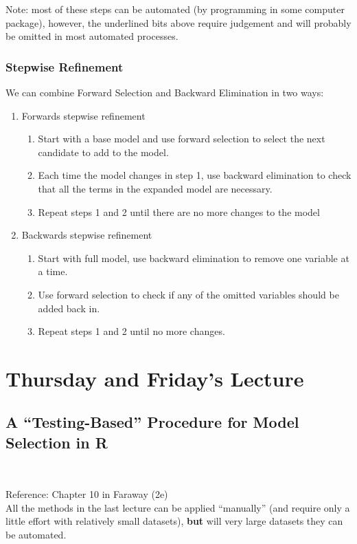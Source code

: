 \documentclass[a4paper, 11pt, twoside]{article}
\begin{document}
Note: most of these steps can be automated (by programming in some computer package), however, the underlined bits above require judgement and will probably be omitted in most automated processes.

\subsubsection{Stepwise Refinement}

We can combine Forward Selection and Backward Elimination in two ways:

\begin{enumerate}
	\item Forwards	stepwise refinement
	\begin{enumerate}
		\item Start with a base model and use forward selection to select the next candidate to add to the model.
		\item Each time the model changes in step 1, use backward elimination to check that all the terms in the expanded model are necessary.
		\item Repeat steps 1 and 2 until there are no more changes to the model
	\end{enumerate}
	\item Backwards stepwise refinement
	\begin{enumerate}
		\item Start with full model, use backward elimination to remove one variable at a time.
		\item Use forward selection to check if any of the omitted variables should be added back in.
		\item Repeat steps 1 and 2 until no more changes.	
	\end{enumerate}
\end{enumerate}

\section{Thursday and Friday's Lecture}
\subsection{A ``Testing-Based'' Procedure for Model Selection in R}\ 

Reference: Chapter 10 in Faraway (2e)\\

All the methods in the last lecture can be applied ``manually'' (and require only a little effort with relatively small datasets), \textbf{but} will very large datasets they can be automated.\\
\end{document}
